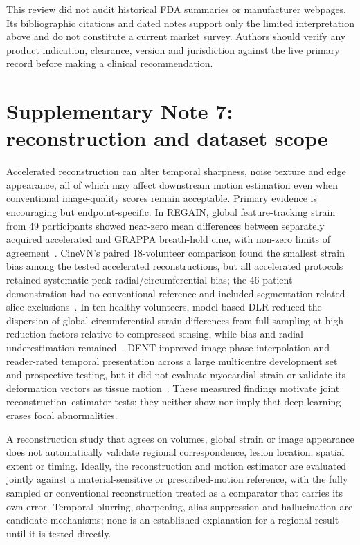 \documentclass[11pt,a4paper]{article}
\begin{document}
This review did not audit historical FDA summaries or manufacturer webpages. Its bibliographic citations and dated notes support only the limited interpretation above and do not constitute a current market survey. Authors should verify any product indication, clearance, version and jurisdiction against the live primary record before making a clinical recommendation.

\section*{Supplementary Note 7: reconstruction and dataset scope}

Accelerated reconstruction can alter temporal sharpness, noise texture and edge appearance, all of which may affect downstream motion estimation even when conventional image-quality scores remain acceptable. Primary evidence is encouraging but endpoint-specific. In REGAIN, global feature-tracking strain from 49 participants showed near-zero mean differences between separately acquired accelerated and GRAPPA breath-hold cine, with non-zero limits of agreement~\cite{yoon2023regain}. CineVN's paired 18-volunteer comparison found the smallest strain bias among the tested accelerated reconstructions, but all accelerated protocols retained systematic peak radial/circumferential bias; the 46-patient demonstration had no conventional reference and included segmentation-related slice exclusions~\cite{vornehm2024cinevn}. In ten healthy volunteers, model-based DLR reduced the dispersion of global circumferential strain differences from full sampling at high reduction factors relative to compressed sensing, while bias and radial underestimation remained~\cite{tsuneta2025dlr}. DENT improved image-phase interpolation and reader-rated temporal presentation across a large multicentre development set and prospective testing, but it did not evaluate myocardial strain or validate its deformation vectors as tissue motion~\cite{morales2024dent}. These measured findings motivate joint reconstruction--estimator tests; they neither show nor imply that deep learning erases focal abnormalities.

A reconstruction study that agrees on volumes, global strain or image appearance does not automatically validate regional correspondence, lesion location, spatial extent or timing. Ideally, the reconstruction and motion estimator are evaluated jointly against a material-sensitive or prescribed-motion reference, with the fully sampled or conventional reconstruction treated as a comparator that carries its own error. Temporal blurring, sharpening, alias suppression and hallucination are candidate mechanisms; none is an established explanation for a regional result until it is tested directly.
\end{document}
